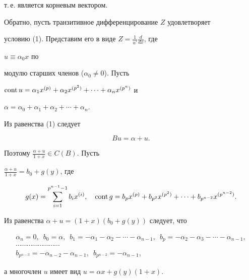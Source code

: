 т.\,е. является корневым вектором. 


 


Обратно, пусть транзитивное дифференцирование $Z$ удовлетворяет 


условию (1). Представим его в виде $Z=\frac{1}{u'}\frac{d}{dx}$, где 


$u\equiv\alpha_0x$ по 


модулю старших членов ($\alpha_0\ne 0$). Пусть 


$\cont u=\alpha_1x^{(p)}+\alpha_2x^{(p^2)}+\dotsb+ 


\alpha_n x^{(p^n)}$ и 


$\alpha=\alpha_0+\alpha_1+\alpha_2+\dotsb+\alpha_n$. 


Из равенства (1) следует 


\begin{equation} 


B u=\alpha+u. 


\end{equation} 


Поэтому $\frac{\alpha+u}{1+x}\in C(B)$. Пусть 


$\frac{\alpha+u}{1+x}=b_0+g(y)$, где 


$$ 


g(x)=\sum^{p^{n-1}-1}_{i=1}b_i x^{(i)},\quad 


\cont g=b_p x^{(p)}+b_{p^2}x^{(p^2)}+\dotsb+ 


b_{p^{n-2}}x^{(p^{n-2})}. 


$$ 


Из равенства $\alpha+u=(1+x)(b_0+g(y))$ следует, что 


\begin{gather*} 


\alpha_n=0,\ \; b_0=\alpha, 


\ \; b_1=-\alpha_1-\alpha_2-\dotsb-\alpha_{n-1}, 


\ \; b_p=-\alpha_2-\alpha_3-\dotsb-\alpha_{n-1},\\ 


\dotsb\dotsb\dotsb\dotsb\dotsb\dotsb\dotsb\dotsb\\ 


b_{p^{n-3}}=-\alpha_{n-2}-\alpha_{n-1}, 


\ \;b_{p^{n-2}}=-\alpha_{n-1}, 


\end{gather*} 


а многочлен $u$ имеет вид $u=\alpha x+g(y)(1+x)$. 


